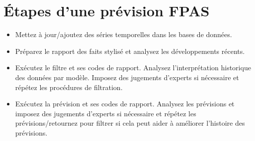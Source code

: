 \section {Étapes d'une prévision FPAS}
\begin{itemize}
    \item Mettez à jour/ajoutez des séries temporelles dans les bases de données.
    \item Préparez le rapport des faits stylisé et analysez les développements récents.
    \item Exécutez le filtre et ses codes de rapport. Analysez l'interprétation historique des données par modèle. Imposez des jugements d'experts si nécessaire et répétez les procédures de filtration.
    \item Exécutez la prévision et ses codes de rapport. Analysez les prévisions et imposez des jugements d'experts si nécessaire et répétez les prévisions/retournez pour filtrer si cela peut aider à améliorer l'histoire des prévisions.
\end{itemize}    